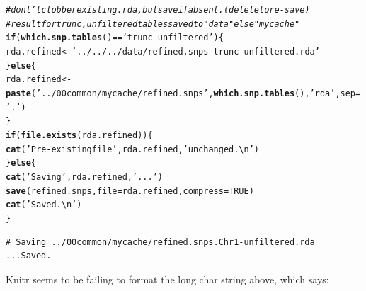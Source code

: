 \documentclass{article}\usepackage[]{graphicx}\usepackage[]{color}
\makeatletter
\newcommand{\hlnum}[1]{\textcolor[rgb]{0.686,0.059,0.569}{#1}}%
\newcommand{\hlstr}[1]{\textcolor[rgb]{0.192,0.494,0.8}{#1}}%
\newcommand{\hlcom}[1]{\textcolor[rgb]{0.678,0.584,0.686}{\textit{#1}}}%
\newcommand{\hlopt}[1]{\textcolor[rgb]{0,0,0}{#1}}%
\newcommand{\hlstd}[1]{\textcolor[rgb]{0.345,0.345,0.345}{#1}}%
\newcommand{\hlkwa}[1]{\textcolor[rgb]{0.161,0.373,0.58}{\textbf{#1}}}%
\newcommand{\hlkwb}[1]{\textcolor[rgb]{0.69,0.353,0.396}{#1}}%
\newcommand{\hlkwc}[1]{\textcolor[rgb]{0.333,0.667,0.333}{#1}}%
\newcommand{\hlkwd}[1]{\textcolor[rgb]{0.737,0.353,0.396}{\textbf{#1}}}%
\newenvironment{kframe}{%
 \def\at@end@of@kframe{}%
 \ifinner\ifhmode%
  \def\at@end@of@kframe{\end{minipage}}%
  \begin{minipage}{\columnwidth}%
 \fi\fi%
 \def\FrameCommand##1{\hskip\@totalleftmargin \hskip-\fboxsep
 \colorbox{shadecolor}{##1}\hskip-\fboxsep
     \hskip-\linewidth \hskip-\@totalleftmargin \hskip\columnwidth}%
 \MakeFramed {\advance\hsize-\width
   \@totalleftmargin\z@ \linewidth\hsize
   \@setminipage}}%
 {\par\unskip\endMakeFramed%
 \at@end@of@kframe}
\newenvironment{knitrout}{}{} %
\makeatother
\begin{document}
\begin{knitrout}
\begin{kframe}
\begin{alltt}
\hlcom{# dont't clobber existing .rda, but save if absent.  (delete to re-save)}
\hlcom{# result for trunc, unfiltered tables saved to "data" else "mycache"}
\hlkwa{if}\hlstd{(}\hlkwd{which.snp.tables}\hlstd{()} \hlopt{==} \hlstr{'trunc-unfiltered'}\hlstd{)\{}
  \hlstd{rda.refined} \hlkwb{<-} \hlstr{'../../../data/refined.snps-trunc-unfiltered.rda'}
\hlstd{\}} \hlkwa{else} \hlstd{\{}
  \hlstd{rda.refined} \hlkwb{<-} \hlkwd{paste}\hlstd{(}\hlstr{'../00common/mycache/refined.snps'}\hlstd{,} \hlkwd{which.snp.tables}\hlstd{(),} \hlstr{'rda'}\hlstd{,} \hlkwc{sep}\hlstd{=}\hlstr{'.'}\hlstd{)}
\hlstd{\}}
\hlkwa{if}\hlstd{(}\hlkwd{file.exists}\hlstd{(rda.refined))\{}
  \hlkwd{cat}\hlstd{(}\hlstr{'Pre-existing file'}\hlstd{, rda.refined,} \hlstr{'unchanged.\textbackslash{}n'}\hlstd{)}
\hlstd{\}} \hlkwa{else} \hlstd{\{}
  \hlkwd{cat}\hlstd{(}\hlstr{'Saving'}\hlstd{, rda.refined,} \hlstr{'...'}\hlstd{)}
  \hlkwd{save}\hlstd{(refined.snps,} \hlkwc{file}\hlstd{=rda.refined,} \hlkwc{compress}\hlstd{=}\hlnum{TRUE}\hlstd{)}
  \hlkwd{cat}\hlstd{(}\hlstr{'Saved.\textbackslash{}n'}\hlstd{)}
\hlstd{\}}
\end{alltt}
\begin{verbatim}
# Saving ../00common/mycache/refined.snps.Chr1-unfiltered.rda ...Saved.
\end{verbatim}
\end{kframe}
\end{knitrout}

Knitr seems to be failing to format the long char string above, which says:
\end{document}
